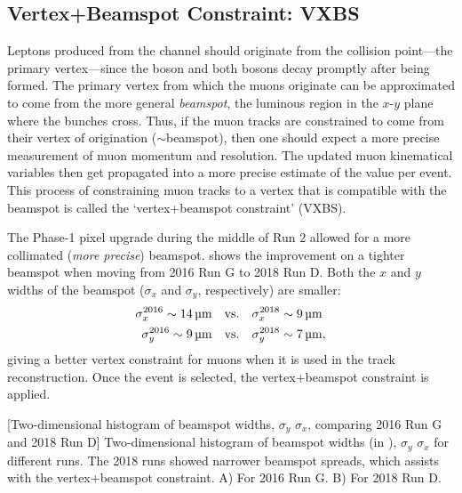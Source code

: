 \subsection{Vertex+Beamspot Constraint: VXBS}
Leptons produced from the \hzzfourl channel should originate from the \pp collision point---the primary vertex---since the \PH boson and both \PZ bosons decay promptly after being formed.
The primary vertex from which the muons originate can be approximated to come from the more general \emph{beamspot}, \ie the luminous region in the $x$-$y$ plane where the \pp bunches cross.
Thus, if the muon tracks are constrained to come from their vertex of origination ($\sim$beamspot), then one should expect a more precise measurement of muon momentum and resolution.
The updated muon kinematical variables then get propagated into a more precise estimate of the \mH value per event.
This process of constraining muon tracks to a vertex that is compatible with the beamspot is called the `vertex+beamspot constraint' (VXBS).

The Phase-1 pixel upgrade during the middle of Run 2 allowed for a more collimated (\emph{more precise}) \pp beamspot.
 shows the improvement on a tighter beamspot when moving from 2016 Run G to 2018 Run D.
Both the $x$ and $y$ widths of the beamspot ($\sigma_x$ and $\sigma_y$, respectively) are smaller:
\begin{align*}
    \sigma_x^{2016} \sim 14\mum \quad &  \vs \quad \sigma_x^{2018} \sim 9\mum
    \\
    \vspace{3pt}
    \sigma_y^{2016} \sim 9\mum \quad &  \vs \quad \sigma_y^{2018} \sim 7\mum,
\end{align*}
giving a better vertex constraint for muons when it is used in the track reconstruction.
Once the event is selected, the vertex+beamspot constraint is applied.
\begin{multiFigure}
    \centering
        [Two-dimensional histogram of beamspot widths, $\sigma_y$ \vs $\sigma_x$, comparing 2016 Run G and 2018 Run D]
        {Two-dimensional histogram of beamspot widths (in \cmns), $\sigma_y$ \vs $\sigma_x$ for different runs.
        The 2018 runs showed narrower beamspot spreads, which assists with the vertex+beamspot constraint.
        \;A) For 2016 Run G.
        \;B) For 2018 Run D.}
    \label{fig:BeamY_vs_Y}
\end{multiFigure}

